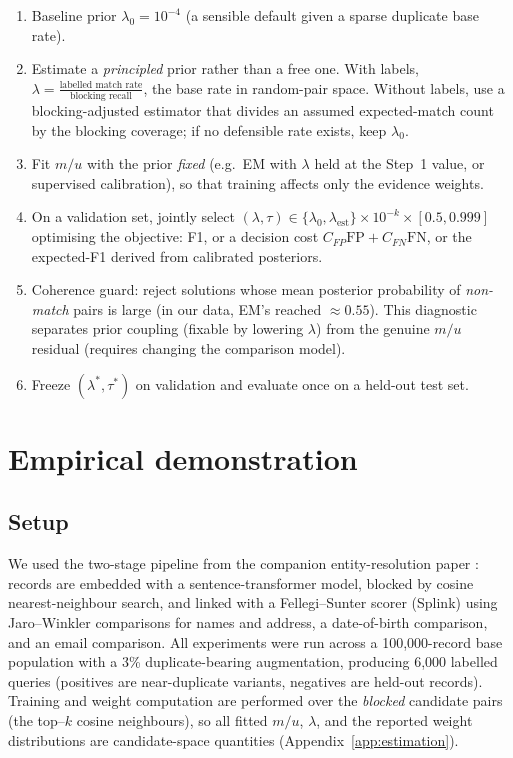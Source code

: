 \documentclass[conference]{IEEEtran}
\begin{document}
\begin{enumerate}
\item[\textbf{Step 0.}] Baseline prior $\lambda_0=10^{-4}$ (a sensible default given a
sparse duplicate base rate).
\item[\textbf{Step 1.}] Estimate a \emph{principled} prior rather than a free one. With
labels, $\lambda=\tfrac{\text{labelled match rate}}{\text{blocking recall}}$, the base rate
in random-pair space. Without labels, use a blocking-adjusted estimator
\cite{winkler2000} that divides an assumed expected-match count by the blocking coverage;
if no defensible rate exists, keep $\lambda_0$.
\item[\textbf{Step 2.}] Fit $m/u$ with the prior \emph{fixed} (e.g.\ EM with
${\lambda}$ held at the Step~1 value, or supervised calibration), so that training affects
only the evidence weights.
\item[\textbf{Step 3.}] On a validation set, jointly select
$(\lambda,\tau)\in\{\lambda_0,\lambda_\mathrm{est}\}\times 10^{-k}\times[0.5,0.999]$
optimising the objective: F1, or a decision cost $C_{FP}\mathrm{FP}+C_{FN}\mathrm{FN}$, or
the expected-F1 derived from calibrated posteriors.
\item[\textbf{Step 4.}] Coherence guard: reject solutions whose mean posterior probability
of \emph{non-match} pairs is large (in our data, EM's reached $\approx 0.55$). This
diagnostic separates prior coupling (fixable by lowering $\lambda$) from the genuine
$m/u$ residual (requires changing the comparison model).
\item[\textbf{Step 5.}] Freeze $(\lambda^*,\tau^*)$ on validation and evaluate once on a
held-out test set.
\end{enumerate}

\section{Empirical demonstration}
\label{sec:emp}

\subsection{Setup}
We used the two-stage pipeline from the companion entity-resolution paper
\cite{pipeline}: records are embedded with a
sentence-transformer model, blocked by cosine nearest-neighbour search, and linked with a
Fellegi--Sunter scorer (Splink) using Jaro--Winkler comparisons for names and address, a
date-of-birth comparison, and an email comparison. All experiments were run across a
100{,}000-record base population with a 3\% duplicate-bearing augmentation, producing
6{,}000 labelled queries (positives are near-duplicate variants, negatives are held-out
records). Training and weight computation are performed over the \emph{blocked} candidate
pairs (the top--$k$ cosine neighbours), so all fitted $m/u$, $\lambda$, and the reported
weight distributions are candidate-space quantities (Appendix~\ref{app:estimation}).
\end{document}
